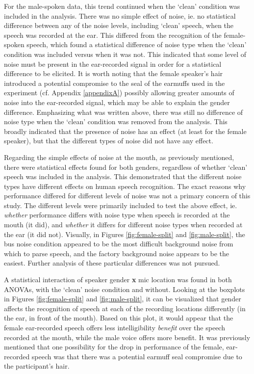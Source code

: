 For the male-spoken data, this trend continued when the `clean' condition was included in the analysis.  There was no simple effect of noise, ie. no statistical difference between any of the noise levels, including `clean' speech, when the speech was recorded at the ear.  This differed from the recognition of the female-spoken speech, which found a statistical difference of noise type when the `clean' condition was included versus when it was not.  This indicated that some level of noise must be present in the ear-recorded signal in order for a statistical difference to be elicited.  It is worth noting that the female speaker's hair introduced a potential compromise to the seal of the earmuffs used in the experiment (cf. Appendix \ref{appendixA}) possibly allowing greater amounts of noise into the ear-recorded signal, which may be able to explain the gender difference. Emphasizing what was written above, there was still no difference of noise type when the `clean' condition was removed from the analysis.  This broadly indicated that the presence of noise has an effect (at least for the female speaker), but that the different types of noise did not have any effect.

Regarding the simple effects of noise at the mouth, as previously mentioned, there were statistical effects found for both genders, regardless of whether `clean' speech was included in the analysis.  This demonstrated that the different noise types have different effects on human speech recognition.  The exact reasons why performance differed for different levels of noise was not a primary concern of this study.  The different levels were primarily included to test the above effect, ie. \textit{whether} performance differs with noise type when speech is recorded at the mouth (it did), and \textit{whether} it differs for different noise types when recorded at the ear (it did not).  Visually, in Figures \ref{fig:female-split} and \ref{fig:male-split}, the bus noise condition appeared to be the most difficult background noise from which to parse speech, and the factory background noise appears to be the easiest.  Further analysis of these particular differences was not pursued.



A statistical interaction of speaker gender \textbf{x} mic location was found in both ANOVAs, with the `clean' noise condition and without.  
Looking at the boxplots in Figures \ref{fig:female-split} and \ref{fig:male-split}, it can be visualized that gender affects the recognition of speech at each of the recording locations differently (in the ear, in front of the mouth).  Based on this plot, it would appear that the female ear-recorded speech offers less intelligibility \textit{benefit} over the speech recorded at the mouth, while the male voice offers more benefit. It was previously mentioned that one possibility for the drop in performance of the female, ear-recorded speech was that there was a potential earmuff seal compromise due to the participant's hair.  

